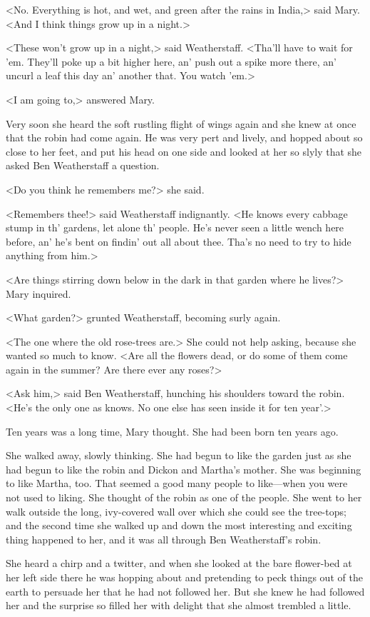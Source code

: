 <No. Everything is hot, and wet, and green after the rains in India,> said Mary. <And I think things grow up in a night.>

<These won't grow up in a night,> said Weatherstaff. <Tha'll have to wait for 'em. They'll poke up a bit higher here, an' push out a spike more there, an' uncurl a leaf this day an' another that. You watch 'em.>

<I am going to,> answered Mary.

Very soon she heard the soft rustling flight of wings again and she knew at once that the robin had come again. He was very pert and lively, and hopped about so close to her feet, and put his head on one side and looked at her so slyly that she asked Ben Weatherstaff a question.

<Do you think he remembers me?> she said.

<Remembers thee!> said Weatherstaff indignantly. <He knows every cabbage stump in th' gardens, let alone th' people. He's never seen a little wench here before, an' he's bent on findin' out all about thee. Tha's no need to try to hide anything from him.>

<Are things stirring down below in the dark in that garden where he lives?> Mary inquired.

<What garden?> grunted Weatherstaff, becoming surly again.

<The one where the old rose-trees are.> She could not help asking, because she wanted so much to know. <Are all the flowers dead, or do some of them come again in the summer? Are there ever any roses?>

<Ask him,> said Ben Weatherstaff, hunching his shoulders toward the robin. <He's the only one as knows. No one else has seen inside it for ten year'.>

Ten years was a long time, Mary thought. She had been born ten years ago.

She walked away, slowly thinking. She had begun to like the garden just as she had begun to like the robin and Dickon and Martha's mother. She was beginning to like Martha, too. That seemed a good many people to like—when you were not used to liking. She thought of the robin as one of the people. She went to her walk outside the long, ivy-covered wall over which she could see the tree-tops; and the second time she walked up and down the most interesting and exciting thing happened to her, and it was all through Ben Weatherstaff's robin.

She heard a chirp and a twitter, and when she looked at the bare flower-bed at her left side there he was hopping about and pretending to peck things out of the earth to persuade her that he had not followed her. But she knew he had followed her and the surprise so filled her with delight that she almost trembled a little.

